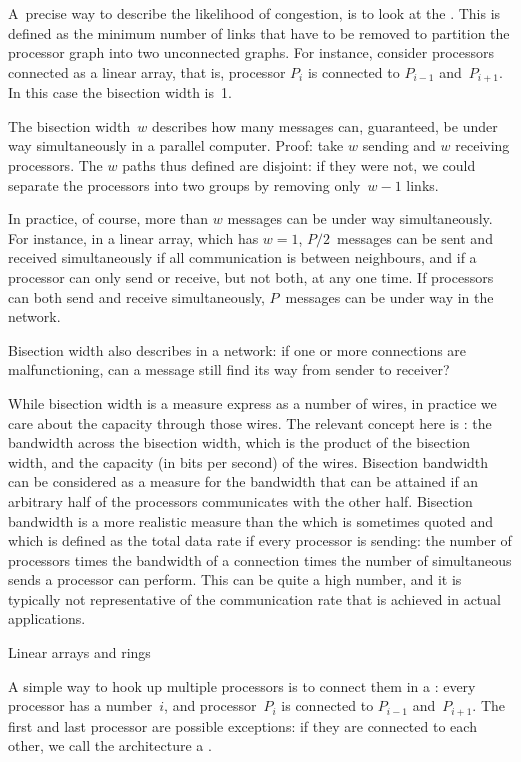 A~precise way to describe the likelihood of congestion, is
to look at the . This is defined as the
minimum number of links that have to be removed to partition the
processor graph into two unconnected graphs. For instance, consider
processors connected as a linear array, that is, processor $P_i$ is
connected to $P_{i-1}$ and~$P_{i+1}$. In this case the bisection width
is~1.

The bisection width~$w$ describes how many messages can, guaranteed,
be under way simultaneously in a parallel computer. Proof: take $w$
sending and $w$ receiving processors. The $w$ paths thus defined are
disjoint: if they were not, we could separate the processors into two
groups by removing only~$w-1$ links. 

In practice, of course, more than
$w$ messages can be under way simultaneously. For instance, in a
linear array, which has $w=1$, $P/2$~messages can be sent and received
simultaneously if all communication is between neighbours, and if a
processor can only send or receive, but not both, at any one time. If
processors can both send and receive simultaneously, $P$~messages can
be under way in the network.

Bisection width also describes  in a network: if
one or more connections are malfunctioning, can a message
still find its way from sender to receiver?

While bisection width is a measure express as a number of wires, in
practice we care about the capacity through those wires. The relevant
concept here is : the bandwidth across
the bisection width, which is the product of the bisection width, and
the capacity (in bits per second) of the wires.  
%
Bisection bandwidth
can be considered as a measure for the bandwidth that can be attained
if an arbitrary half of the processors communicates with the other
half.
Bisection bandwidth is a more realistic measure than the
 which is sometimes quoted
and which is defined
as the  total data rate if every processor is sending: the number of
processors times the bandwidth of a connection times the number of
simultaneous sends a processor can perform. This can be quite
a high number, and it is typically not representative of the
communication rate that is achieved in actual applications.

 {Linear arrays and rings}

A simple way to hook up multiple processors is to connect them in a
: every processor has a number~$i$, and
processor~$P_i$ is connected to $P_{i-1}$ and~$P_{i+1}$. The first and
last processor are possible exceptions: if they are connected to each
other, we call the architecture a .

